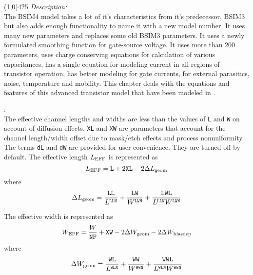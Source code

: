 \documentclass{article}
\begin{document}
\noindent\linethickness{0.5mm} \line(1,0){425}
\newline
\textit{Description:}\\
The BSIM4 model takes a lot of it's characteristics from it's
predecessor, BSIM3 but also adds enough functionality to name it
with a new model number. It uses many new parameters and replaces
some old BSIM3 parameters. It uses a newly formulated smoothing
function for gate-source voltage. It uses more than 200
parameters, uses charge conserving equations for calculation of
various capacitances, has a single equation for modeling current
in all regions of transistor operation, has better modeling for
gate currents, for external parasitics, noise, temperature and
mobility. This chapter deals with the equations and features of
this advanced transistor model that have been modeled in \FDA.

:\\
The effective channel lengths and widths are less than the values
of \texttt{L} and \texttt{W} on account of diffusion effects.
\texttt{XL} and \texttt{XW} are parameters that account for the
channel length/width offset due to mask/etch effects and process
nonuniformity. The terms \texttt{dL} and \texttt{dW} are provided
for user convenience. They are turned off by default. The
effective length $L_{\rm{EFF}}$ is represented as
\begin{equation}
L_{\rm{EFF}} = \texttt{L} + 2\texttt{XL} - 2\Delta L_{\rm{geom}}\\
\end {equation}
where
\begin{equation}
\Delta L_{\rm{geom}} = {\texttt{LL} \over L^{\texttt{LLN}}} +
{\texttt{LW} \over W^{\texttt{LWN}}} + {\texttt{LWL} \over
L^{\texttt{LLN}}W^{\texttt{LWN}}}
\end{equation}

\noindent The effective width is represented as
\begin{equation}
W_{\rm{EFF}} = {W \over \texttt{NF}} + \texttt{XW} - 2\Delta
W_{\rm{geom}} - 2\Delta W_{\rm{biasdep}}
\end{equation}
where
\begin{equation}
\Delta W_{\rm{geom}} = {\texttt{WL} \over L^{\texttt{WLN}}} +
{\texttt{WW} \over W^{\texttt{WWN}}} + {\texttt{WWL} \over
L^{\texttt{WLN}}W^{\texttt{WWN}}}
\end{equation}
\end{document}

